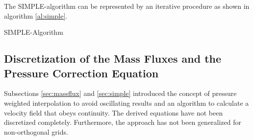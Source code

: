 The SIMPLE-algorithm can be represented by an iterative procedure as shown in algorithm \ref{al:simple}.
\begin{algorithm}
\label{al:simple}
\caption{SIMPLE-Algorithm}
\begin{algorithmic}
  \EndIf
\EndWhile
{}
  \EndIf
\end{algorithmic}
\end{algorithm}

\subsection{Discretization of the Mass Fluxes and the Pressure Correction Equation}
\label{sec:segpresscorr}

Subsections \ref{sec:massflux} and \ref{sec:simple} introduced the concept of pressure weighted interpolation to avoid oscillating results and an algorithm to calculate a velocity field that obeys continuity. The derived equations have not been discretized completely. Furthermore, the approach has not been generalized for non-orthogonal grids.

